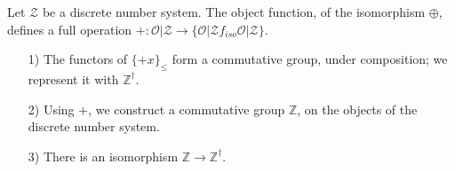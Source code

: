 \documentclass [12pt]{book}
\begin{document}
\begin{theorem}Let $\mathcal Z$ be a discrete number system. The object function, of the isomorphism $\oplus$, defines a full operation $+:\mathcal{O|Z}\rightarrow\{\mathcal{O|Z}f_{iso}\mathcal{O|Z}\}$. \begin{itemize}\item[1)]The functors of $\{+x\}_\leq$ form a commutative group, under composition; we represent it with $\mathbb Z^\dagger$. \item[2)]Using $+$, we construct a commutative group $\mathbb Z$, on the objects of the discrete number system.\item[3)]There is an isomorphism $\mathbb Z\rightarrow\mathbb Z^\dagger$.\end{itemize}\end{theorem}
\end{document}
